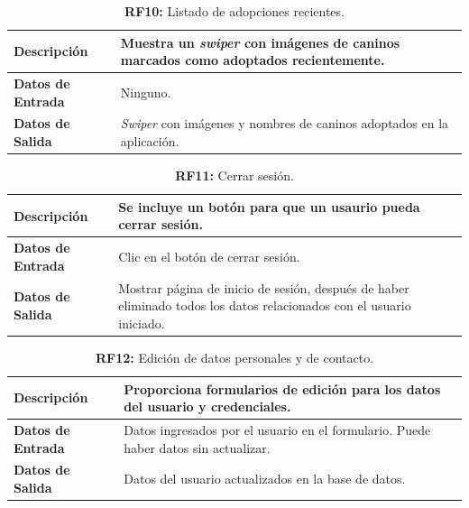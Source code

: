 \documentclass[a4paper, 12pt]{article}
\begin{document}
\begin{table}[H]
\captionsetup{list=no}%
\captionsetup{justification=raggedright,singlelinecheck=false}
\captionsetup{labelformat=empty}
\caption{\textbf{RF10:} Listado de adopciones recientes.}
\label{tab:RF10}
	\begin{tabular}{|m{5cm}|m{10cm}|}
	\hline
	\textbf{Descripción} & Muestra un \textit{swiper} con imágenes de caninos marcados como adoptados recientemente. \\ 
	\hline
	\textbf{Datos de Entrada} & Ninguno. \\ 
	\hline
	\textbf{Datos de Salida} & \textit{Swiper} con imágenes y nombres de caninos adoptados en la aplicación. \\ 
	\hline
\end{tabular}
\end{table}

\begin{table}[H]
\captionsetup{list=no}%
\captionsetup{justification=raggedright,singlelinecheck=false}
\captionsetup{labelformat=empty}
\caption{\textbf{RF11:} Cerrar sesión.}
\label{tab:RF11}
	\begin{tabular}{|m{5cm}|m{10cm}|}
	\hline
	\textbf{Descripción} & Se incluye un botón para que un usaurio pueda cerrar sesión. \\ 
	\hline
	\textbf{Datos de Entrada} & Clic en el botón de cerrar sesión. \\ 
	\hline
	\textbf{Datos de Salida} & Mostrar página de inicio de sesión, después de haber eliminado todos los datos relacionados con el usuario iniciado. \\ 
	\hline
\end{tabular}
\end{table}


\begin{table}[H]
\captionsetup{list=no}%
\captionsetup{justification=raggedright,singlelinecheck=false}
\captionsetup{labelformat=empty}
\caption{\textbf{RF12:} Edición de datos personales y de contacto.}
\label{tab:RF12}
	\begin{tabular}{|m{5cm}|m{10cm}|}
	\hline
	\textbf{Descripción} & Proporciona formularios de edición para los datos del usuario y credenciales. \\ 
	\hline
	\textbf{Datos de Entrada} & Datos ingresados por el usuario en el formulario. Puede haber datos sin actualizar. \\ 
	\hline
	\textbf{Datos de Salida} &  Datos del usuario actualizados en la base de datos. \\ 
	\hline
\end{tabular}
\end{table}
\end{document}

